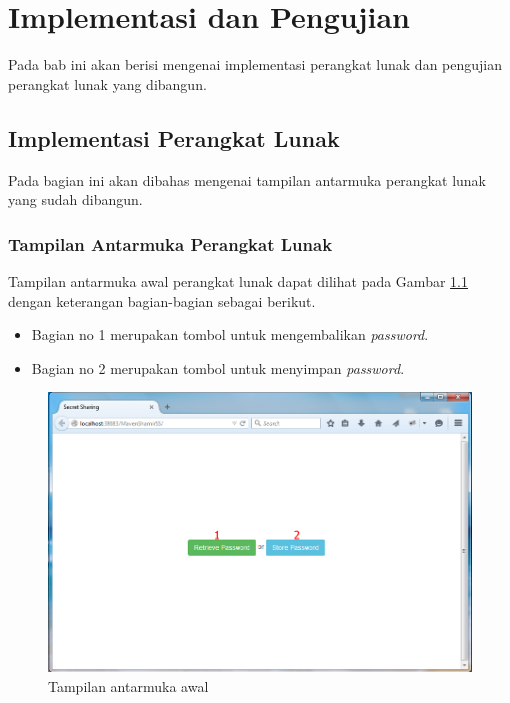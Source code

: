 \chapter{Implementasi dan Pengujian}
\label{chap:Implementasi dan Pengujian}

Pada bab ini akan berisi mengenai implementasi perangkat lunak dan pengujian perangkat lunak yang dibangun.

\section{Implementasi Perangkat Lunak}

Pada bagian ini akan dibahas mengenai tampilan antarmuka perangkat lunak yang sudah dibangun.

\subsection{Tampilan Antarmuka Perangkat Lunak}

Tampilan antarmuka awal perangkat lunak dapat dilihat pada Gambar \ref{fig:tampilan1} dengan keterangan bagian-bagian sebagai berikut.

\begin{itemize}
	\item Bagian no 1 merupakan tombol untuk mengembalikan \textit{password}.
	\item Bagian no 2 merupakan tombol untuk menyimpan \textit{password}.
\end{itemize}

\begin{figure}[H]
	\centerline{\includegraphics[scale=0.5]{Gambar/tampilan1}}
	\caption{Tampilan antarmuka awal}\label{fig:tampilan1}
\end{figure}

